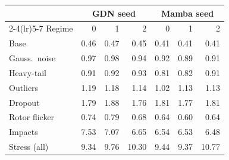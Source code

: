 \begin{tabular}{l rrr rrr}
\toprule
 & \multicolumn{3}{c}{GDN seed} & \multicolumn{3}{c}{Mamba seed} \\
\cmidrule(lr){2-4}\cmidrule(lr){5-7}
Regime & 0 & 1 & 2 & 0 & 1 & 2 \\
\midrule
Base & 0.46 & 0.47 & 0.45 & 0.41 & 0.41 & 0.41 \\
Gauss.\ noise & 0.97 & 0.98 & 0.94 & 0.92 & 0.89 & 0.91 \\
Heavy-tail & 0.91 & 0.92 & 0.93 & 0.81 & 0.82 & 0.91 \\
Outliers & 1.19 & 1.18 & 1.14 & 1.02 & 1.13 & 1.13 \\
Dropout & 1.79 & 1.88 & 1.76 & 1.81 & 1.77 & 1.81 \\
Rotor flicker & 0.74 & 0.79 & 0.68 & 0.64 & 0.60 & 0.64 \\
Impacts & 7.53 & 7.07 & 6.65 & 6.54 & 6.53 & 6.48 \\
Stress (all) & 9.34 & 9.76 & 10.30 & 9.44 & 9.37 & 10.77 \\
\bottomrule
\end{tabular}
